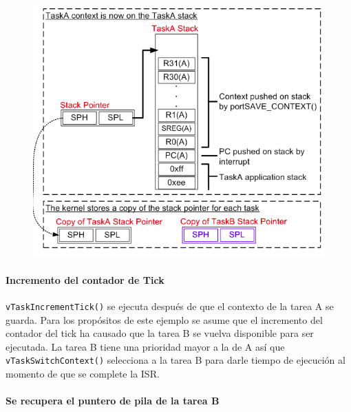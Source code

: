 \begin{figure}[H]
    \centering
    \includegraphics[scale=0.7]{RTOS/f7.PNG}
\end{figure}

\paragraph{Incremento del contador de Tick}

\texttt{vTaskIncrementTick()} se ejecuta después de que el contexto de la tarea A se guarda. Para los propósitos de este ejemplo se asume que el incremento del contador del tick ha causado que la tarea B se vuelva disponible para ser ejecutada. La tarea B tiene una prioridad mayor a la de A así que \texttt{vTaskSwitchContext()} selecciona a la tarea B para darle tiempo de ejecución al momento de que se complete la ISR.

\paragraph{Se recupera el puntero de pila de la tarea B}

